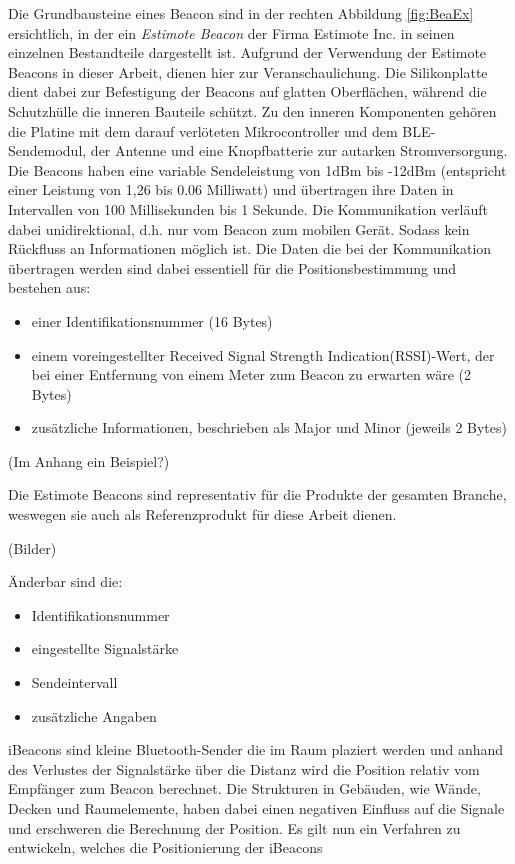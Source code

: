 Die Grundbausteine eines Beacon sind in der rechten Abbildung \ref{fig:BeaEx} ersichtlich, in der ein \textit{Estimote Beacon} der Firma Estimote Inc. in seinen einzelnen Bestandteile dargestellt ist. Aufgrund der Verwendung der Estimote Beacons in dieser Arbeit, dienen hier zur Veranschaulichung. Die Silikonplatte dient dabei zur Befestigung der Beacons auf glatten Oberflächen, während die Schutzhülle die inneren Bauteile schützt. Zu den inneren Komponenten gehören die Platine mit dem darauf verlöteten Mikrocontroller und dem BLE-Sendemodul, der Antenne und eine Knopfbatterie zur autarken Stromversorgung. Die Beacons haben eine variable Sendeleistung von 1dBm bis -12dBm (entspricht einer Leistung von 1,26 bis 0.06 Milliwatt) und übertragen ihre Daten in Intervallen von 100 Millisekunden bis 1 Sekunde. Die Kommunikation verläuft dabei unidirektional, d.h. nur vom Beacon zum mobilen Gerät. Sodass kein Rückfluss an Informationen möglich ist. Die Daten die bei der Kommunikation übertragen werden sind dabei essentiell für die Positionsbestimmung und bestehen aus:
\begin{itemize}
\item einer Identifikationsnummer (16 Bytes)
\item einem voreingestellter Received Signal Strength Indication(RSSI)-Wert, der bei einer Entfernung von einem Meter zum Beacon zu erwarten wäre (2 Bytes)
\item zusätzliche Informationen, beschrieben als Major und Minor (jeweils 2 Bytes)
\end{itemize}
(Im Anhang ein Beispiel?) 

Die Estimote Beacons sind representativ für die Produkte der gesamten Branche, weswegen sie auch als Referenzprodukt für diese Arbeit dienen.

(Bilder)

Änderbar sind die:
\begin{itemize}
\item Identifikationsnummer
\item eingestellte Signalstärke
\item Sendeintervall
\item zusätzliche Angaben
\end{itemize}

iBeacons sind kleine Bluetooth-Sender die im Raum plaziert werden und anhand des Verlustes der Signalstärke über die Distanz wird die Position relativ vom Empfänger zum Beacon berechnet. Die Strukturen in Gebäuden, wie Wände, Decken und Raumelemente, haben dabei einen negativen Einfluss auf die Signale und erschweren die Berechnung der Position. Es gilt nun ein Verfahren zu entwickeln, welches die Positionierung der iBeacons

